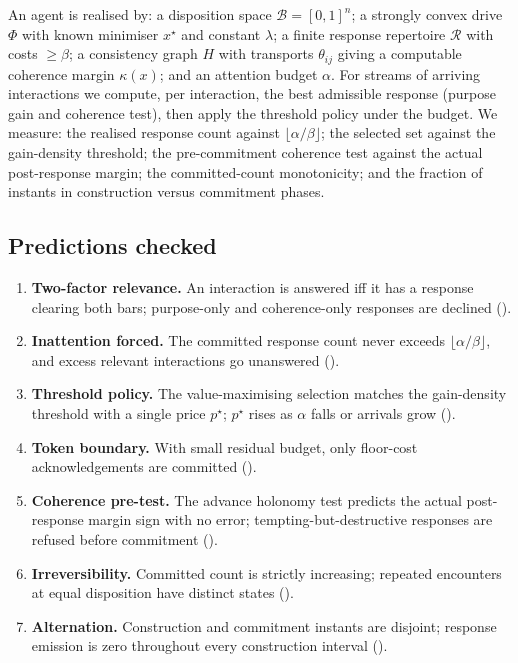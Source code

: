 \documentclass[11pt,twocolumn,a4paper]{article}
\newcommand{\Beh}{\mathcal{B}}       %
\newcommand{\Purp}{x^{\star}}        %
\newcommand{\drive}{\Phi}            %
\newcommand{\lam}{\lambda}
\newcommand{\Resp}{\mathcal{R}}      %
\newcommand{\floorc}{\beta}          %
\newcommand{\att}{\alpha}            %
\newcommand{\coh}{\kappa}            %
\begin{document}
An agent is realised by: a disposition space $\Beh=[0,1]^n$; a strongly
convex drive $\drive$ with known minimiser $\Purp$ and constant $\lam$; a
finite response repertoire $\Resp$ with costs $\ge\floorc$; a consistency
graph $H$ with transports $\theta_{ij}$ giving a computable coherence
margin $\coh(x)$; and an attention budget $\att$. For streams of arriving
interactions we compute, per interaction, the best admissible response
(purpose gain and coherence test), then apply the threshold policy under
the budget. We measure: the realised response count against
$\lfloor\att/\floorc\rfloor$; the selected set against the gain-density
threshold; the pre-commitment coherence test against the actual
post-response margin; the committed-count monotonicity; and the fraction
of instants in construction versus commitment phases.

\subsection{Predictions checked}

\begin{enumerate}[label=\textbf{(V\arabic*)},leftmargin=*]
\item \textbf{Two-factor relevance.} An interaction is answered iff it has
a response clearing both bars; purpose-only and coherence-only responses
are declined ().
\item \textbf{Inattention forced.} The committed response count never
exceeds $\lfloor\att/\floorc\rfloor$, and excess relevant interactions go
unanswered ().
\item \textbf{Threshold policy.} The value-maximising selection matches the
gain-density threshold with a single price $p^\star$; $p^\star$ rises as
$\att$ falls or arrivals grow ().
\item \textbf{Token boundary.} With small residual budget, only floor-cost
acknowledgements are committed ().
\item \textbf{Coherence pre-test.} The advance holonomy test predicts the
actual post-response margin sign with no error; tempting-but-destructive
responses are refused before commitment
().
\item \textbf{Irreversibility.} Committed count is strictly increasing;
repeated encounters at equal disposition have distinct states
().
\item \textbf{Alternation.} Construction and commitment instants are
disjoint; response emission is zero throughout every construction interval
().
\end{enumerate}
\end{document}
